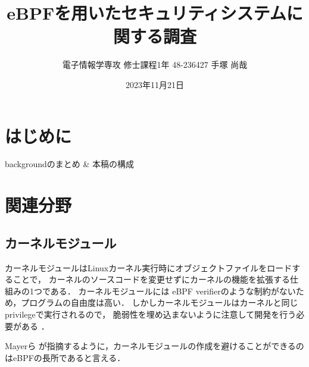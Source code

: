 \documentclass[platex,a4j,10pt,twoside,twocolumn,dvipdfmx]{jsarticle}
\title{eBPFを用いたセキュリティシステムに関する調査 \\
\large{\textgt{A Survey on Security Systems with eBPF}}}
\author{電子情報学専攻 修士課程1年 48-236427 手塚 尚哉}
\date{2023年11月21日}
\begin{document}



\section{はじめに}
backgroundのまとめ \& 本稿の構成


    
\section{関連分野}
  \subsection{カーネルモジュール}
  カーネルモジュールはLinuxカーネル実行時にオブジェクトファイルをロードすることで，
  カーネルのソースコードを変更せずにカーネルの機能を拡張する仕組みの1つである．
  カーネルモジュールには eBPF verifierのような制約がないため，プログラムの自由度は高い．
  しかしカーネルモジュールはカーネルと同じprivilegeで実行されるので，
  脆弱性を埋め込まないように注意して開発を行う必要がある \cite{chen2011linux}．

  Mayerら \cite{mayer2021performance}が指摘するように，カーネルモジュールの作成を避けることができるのはeBPFの長所であると言える．
  
\end{document}
